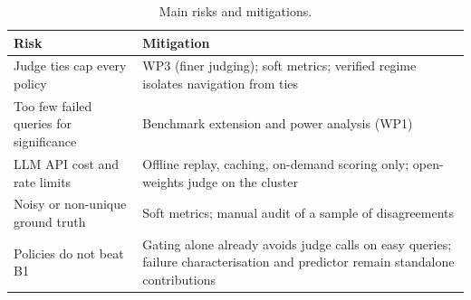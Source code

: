 \begin{table}[htbp]
\centering
\caption{Main risks and mitigations.}
\label{tab:risks}
\small
\begin{tabularx}{\textwidth}{>{\raggedright\arraybackslash}p{4.6cm}X}
\toprule
Risk & Mitigation \\
\midrule
Judge ties cap every policy & WP3 (finer judging); soft metrics; verified regime isolates navigation from ties \\
Too few failed queries for significance & Benchmark extension and power analysis (WP1) \\
LLM API cost and rate limits & Offline replay, caching, on-demand scoring only; open-weights judge on the cluster \\
Noisy or non-unique ground truth & Soft metrics; manual audit of a sample of disagreements \\
Policies do not beat B1 & Gating alone already avoids judge calls on easy queries; failure characterisation and predictor remain standalone contributions \\
\bottomrule
\end{tabularx}
\end{table}
